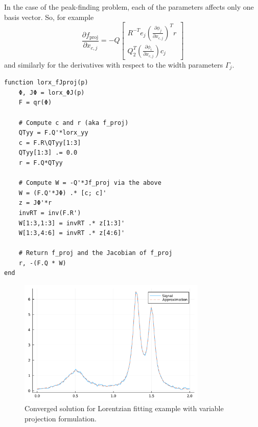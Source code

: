 \documentclass[12pt, leqno]{article} %
\begin{document}
In the case of the peak-finding problem, each of the parameters affects
only one basis vector. So, for example
\[\frac{\partial f_{\mathrm{proj}}}{\partial x_{c,j}}
  = -Q 
  \begin{bmatrix} R^{-T} e_j
    \left( \frac{\partial \phi_j}{\partial x_{c,j}} \right)^T r \\ 
    Q_2^T \left(\frac{\partial \phi_i}{\partial x_{c,j}}\right) c_j 
  \end{bmatrix}\] and similarly for the derivatives with respect to the
width parameters \(\Gamma_j\).

\begin{verbatim}
function lorx_fJproj(p)
    Φ, JΦ = lorx_ΦJ(p)
    F = qr(Φ)
    
    # Compute c and r (aka f_proj)
    QTyy = F.Q'*lorx_yy
    c = F.R\QTyy[1:3]
    QTyy[1:3] .= 0.0
    r = F.Q*QTyy
    
    # Compute W = -Q'*Jf_proj via the above
    W = (F.Q'*JΦ) .* [c; c]'
    z = JΦ'*r
    invRT = inv(F.R')
    W[1:3,1:3] = invRT .* z[1:3]'
    W[1:3,4:6] = invRT .* z[4:6]'
    
    # Return f_proj and the Jacobian of f_proj
    r, -(F.Q * W)
end
\end{verbatim}

\begin{figure}
\begin{center}
  \includegraphics[width=0.8\textwidth]{fig/2023-04-10-lorx_vproj.pdf}
\end{center}
\caption{Converged solution for Lorentzian fitting example with 
  variable projection formulation.}
\label{fig:lorx-vproj}
\end{figure}
\end{document}
